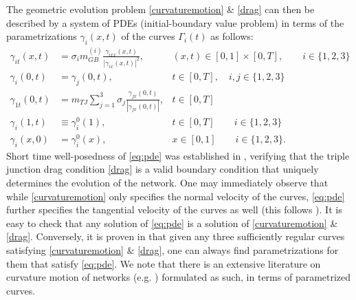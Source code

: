 \documentclass{article}
\theoremstyle{plain}
\theoremstyle{definition}
\theoremstyle{remark}
\begin{document}
The geometric evolution problem \eqref{curvaturemotion} \& \eqref{drag} can then be described by a system of PDEs (initial-boundary value problem) in terms of the parametrizations $\gamma_i(x,t)$ of the curves $\Gamma_i(t)$ as follows:
\begin{equation}\label{eq:pde}
    \begin{aligned}
        \gamma_{it}(x,t) &= \sigma_i m_{GB}^{(i)} \frac{\gamma_{ixx}(x,t)}{|\gamma_{ix}(x,t)|^2}, & (x,t)\in[0,1]\times[0,T], \qquad i\in\{1,2,3\}\\
        \gamma_i(0,t) &= \gamma_j(0,t), &t\in[0,T], \quad i,j\in\{1,2,3\}\\
        \gamma_{1t}(0,t) &= m_{TJ}\sum_{j=1}^3 \sigma_j \frac{\gamma_{jx}(0,t)}{|\gamma_{jx}(0,t)|}, &t\in[0,T] \\
        \gamma_i(1,t) &\equiv \gamma_i^0(1), &t\in[0,T]\qquad i\in\{1,2,3\}\\
        \gamma_i(x,0) &= \gamma_i^0(x), &x\in[0,1]\qquad i\in\{1,2,3\}.
    \end{aligned}
\end{equation}
 Short time well-posedness of \eqref{eq:pde} was established in \cite{yangesedoglu25}, verifying that the triple junction drag condition \eqref{drag} is a valid boundary condition that uniquely determines the evolution of the network. One may immediately observe that while \eqref{curvaturemotion} only specifies the normal velocity of the curves, \eqref{eq:pde} further specifies the tangential velocity of the curves as well (this follows \cite{bronsardreitich}).
 It is easy to check that any solution of \eqref{eq:pde} is a solution of \eqref{curvaturemotion} \& \eqref{drag}. Conversely, it is proven in \cite{yangesedoglu25} that given any three sufficiently regular curves satisfying \eqref{curvaturemotion} \& \eqref{drag}, one can always find parametrizations for them that satisfy \eqref{eq:pde}. We note that there is an extensive literature on curvature motion of networks (e.g. \cite{bronsardreitich,mantegazzanovagatortorelli,pluda,irregularnetworks}) formulated as such, in terms of parametrized curves.
\end{document}
